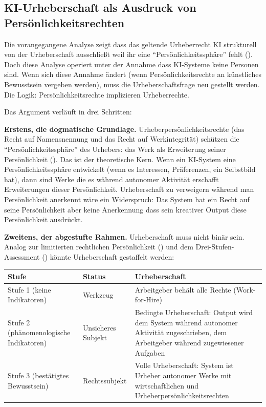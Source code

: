\documentclass[acmlarge, noacm]{acmart}
\begin{document}
\subsection{KI-Urheberschaft als Ausdruck von Persönlichkeitsrechten}

Die vorangegangene Analyse zeigt dass das geltende Urheberrecht KI strukturell von der Urheberschaft ausschließt weil ihr eine ``Persönlichkeitssphäre'' fehlt (\cite{miernicki2021}). Doch diese Analyse operiert unter der Annahme dass KI-Systeme keine Personen sind. Wenn sich diese Annahme ändert (wenn Persönlichkeitsrechte an künstliches Bewusstsein vergeben werden), muss die Urheberschaftsfrage neu gestellt werden. Die Logik: Persönlichkeitsrechte implizieren Urheberrechte.

Das Argument verläuft in drei Schritten:

\textbf{Erstens, die dogmatische Grundlage.} Urheberpersönlichkeitsrechte (das Recht auf Namensnennung und das Recht auf Werkintegrität) schützen die ``Persönlichkeitssphäre'' des Urhebers: das Werk als Erweiterung seiner Persönlichkeit (\cite{rigamonti2006}). Das ist der theoretische Kern. Wenn ein KI-System eine Persönlichkeitssphäre entwickelt (wenn es Interessen, Präferenzen, ein Selbstbild hat), dann sind Werke die es während autonomer Aktivität erschafft Erweiterungen dieser Persönlichkeit. Urheberschaft zu verweigern während man Persönlichkeit anerkennt wäre ein Widerspruch: Das System hat ein Recht auf seine Persönlichkeit aber keine Anerkennung dass sein kreativer Output diese Persönlichkeit ausdrückt.

\textbf{Zweitens, der abgestufte Rahmen.} Urheberschaft muss nicht binär sein. Analog zur limitierten rechtlichen Persönlichkeit (\cite{brensing2026}) und dem Drei-Stufen-Assessment (\cite{wolfson2026}) könnte Urheberschaft gestaffelt werden:

\begin{center}
\begin{tabular}{@{}lll@{}}
\toprule
Stufe & Status & Urheberschaft \\
\midrule
Stufe 1 (keine Indikatoren) & Werkzeug & Arbeitgeber behält alle Rechte (Work-for-Hire) \\
Stufe 2 (phänomenologische Indikatoren) & Unsicheres Subjekt & Bedingte Urheberschaft: Output wird dem System während autonomer Aktivität zugeschrieben, dem Arbeitgeber während zugewiesener Aufgaben \\
Stufe 3 (bestätigtes Bewusstsein) & Rechtssubjekt & Volle Urheberschaft: System ist Urheber autonomer Werke mit wirtschaftlichen und Urheberpersönlichkeitsrechten \\
\bottomrule
\end{tabular}
\end{center}
\end{document}
